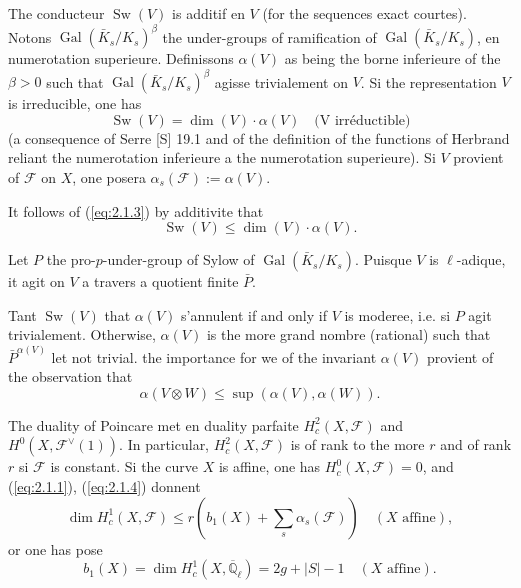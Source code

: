 \documentclass[11pt,a4paper]{article}
\theoremstyle{plain}
\theoremstyle{definition}
\DeclareMathOperator{\Gal}{Gal}
\DeclareMathOperator{\Sw}{Sw}
\begin{document}
The conducteur $\Sw(V)$ is additif en $V$ (for the sequences exact courtes). Notons $\Gal(\bar{K}_s/K_s)^\beta$ the under-groups of ramification of $\Gal(\bar{K}_s/K_s)$, en numerotation superieure. Definissons $\alpha(V)$ as being the borne inferieure of the $\beta > 0$ such that $\Gal(\bar{K}_s/K_s)^\beta$ agisse trivialement on $V$. Si the representation $V$ is irreducible, one has
\begin{equation}\label{eq:2.1.3}
\Sw(V) = \dim(V) \cdot \alpha(V) \quad \text{(V irr\'eductible)}
\end{equation}
(a consequence of Serre [S] 19.1 and of the definition of the functions of Herbrand reliant the numerotation inferieure a the numerotation superieure). Si $V$ provient of $\mathcal{F}$ on $X$, one posera $\alpha_s(\mathcal{F}) := \alpha(V)$.

It follows of (\ref{eq:2.1.3}) by additivite that
\begin{equation}\label{eq:2.1.4}
\Sw(V) \leq \dim(V) \cdot \alpha(V).
\end{equation}

Let $P$ the pro-$p$-under-group of Sylow of $\Gal(\bar{K}_s/K_s)$. Puisque $V$ is $\ell$-adique, it agit on $V$ a travers a quotient finite $\bar{P}$.

Tant $\Sw(V)$ that $\alpha(V)$ s'annulent if and only if $V$ is moderee, i.e. si $P$ agit trivialement. Otherwise, $\alpha(V)$ is the more grand nombre (rational) such that $\bar{P}^{\alpha(V)}$ let not trivial. the importance for we of the invariant $\alpha(V)$ provient of the observation that
\begin{equation}\label{eq:2.1.5}
\alpha(V \otimes W) \leq \sup(\alpha(V), \alpha(W)).
\end{equation}

The duality of Poincare met en duality parfaite $H_c^2(X, \mathcal{F})$ and $H^0(X, \mathcal{F}^\vee(1))$. In particular, $H_c^2(X, \mathcal{F})$ is of rank to the more $r$ and of rank $r$ si $\mathcal{F}$ is constant. Si the curve $X$ is affine, one has $H_c^0(X, \mathcal{F}) = 0$, and (\ref{eq:2.1.1}), (\ref{eq:2.1.4}) donnent
\begin{equation}\label{eq:2.1.6}
\dim H_c^1(X, \mathcal{F}) \leq r(b_1(X) + \sum_s \alpha_s(\mathcal{F})) \quad (X \text{ affine}),
\end{equation}
or one has pose
\begin{equation}\label{eq:2.1.7}
b_1(X) = \dim H_c^1(X, \overline{\mathbb{Q}}_\ell) = 2g + |S| - 1 \quad (X \text{ affine}).
\end{equation}
\end{document}
